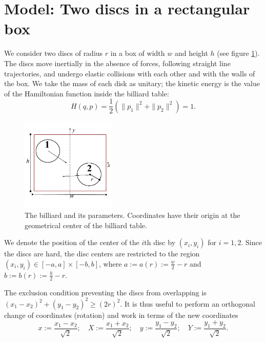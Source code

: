 \documentclass[superscriptaddress,pre,reprint,showpacs,onecolumn]{revtex4-1}
\newcommand{\defeq}{:=}
\begin{document}
\section{Model: Two discs in a rectangular box}


We consider two discs of radius $r$  %
in a box of width $w$ and height $h$ (see figure \ref{billar01}). 
The discs move inertially in the absence of forces, 
following straight line trajectories,
and undergo elastic collisions with each 
other and with the walls of the box.
We take the mass of each disk as unitary; the kinetic energy
is the value of the Hamiltonian function inside the billiard table:
\begin{equation}
H(q,p)=\frac{1}{2}(\|p_1\|^2+\|p_2\|^2)=1.
\end{equation}

\begin{figure}[h]
  \begin{center}
  \includegraphics[width=0.40\textwidth]{FigurasPerfectas/DiscosenCajaCuadrada01.pdf}
  \end{center}
  \caption{The billiard and its parameters. Coordinates
    have their origin at the geometrical center of the 
    billiard table.}\label{billar01}
\end{figure}

We denote the position of the center of the $i$th disc by 
$(x_{i}, y_{i})$ for $i=1,2$. Since the discs are hard, 
the disc centers are restricted to the region 
$(x_i, y_i) \in [-a,a] \times [-b, b]$, where 
$a \defeq a(r) \defeq \frac{w}{2} - r $ and
$b \defeq b(r) \defeq \frac{h}{2} - r $.


The exclusion condition preventing the discs from overlapping is $(x_1-x_2)^2 + (y_1-y_2)^2 \ge (2r)^2$.
It is thus useful to perform an orthogonal change of coordinates (rotation) and work in terms of the new coordinates
\begin{equation}\label{cambiocoor01}
 x \defeq \frac{x_1 - x_2}{\sqrt{2}}; 
\quad X \defeq \frac{x_1 + x_2}{\sqrt{2}}; 
\quad y \defeq \frac{y_1 - y_2}{\sqrt{2}}; 
\quad Y \defeq \frac{y_1 + y_2}{\sqrt{2}}.
\end{equation}
\end{document}
